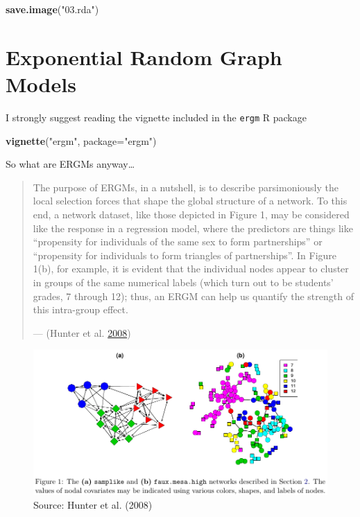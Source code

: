 \documentclass[]{book}
\newenvironment{Shaded}{\begin{snugshade}}{\end{snugshade}}
\newcommand{\KeywordTok}[1]{\textcolor[rgb]{0.13,0.29,0.53}{\textbf{#1}}}
\newcommand{\DataTypeTok}[1]{\textcolor[rgb]{0.13,0.29,0.53}{#1}}
\newcommand{\StringTok}[1]{\textcolor[rgb]{0.31,0.60,0.02}{#1}}
\newcommand{\NormalTok}[1]{#1}
\theoremstyle{definition}
\theoremstyle{definition}
\theoremstyle{definition}
\theoremstyle{remark}
\begin{document}
\begin{Shaded}
\begin{Highlighting}[]
\KeywordTok{save.image}\NormalTok{(}\StringTok{"03.rda"}\NormalTok{)}
\end{Highlighting}
\end{Shaded}

\chapter{Exponential Random Graph
Models}\label{exponential-random-graph-models}

I strongly suggest reading the vignette included in the \texttt{ergm} R
package

\begin{Shaded}
\begin{Highlighting}[]
\KeywordTok{vignette}\NormalTok{(}\StringTok{"ergm"}\NormalTok{, }\DataTypeTok{package=}\StringTok{"ergm"}\NormalTok{)}
\end{Highlighting}
\end{Shaded}

So what are ERGMs anyway\ldots{}

\begin{quote}
The purpose of ERGMs, in a nutshell, is to describe parsimoniously the
local selection forces that shape the global structure of a network. To
this end, a network dataset, like those depicted in Figure 1, may be
considered like the response in a regression model, where the predictors
are things like ``propensity for individuals of the same sex to form
partnerships'' or ``propensity for individuals to form triangles of
partnerships''. In Figure 1(b), for example, it is evident that the
individual nodes appear to cluster in groups of the same numerical
labels (which turn out to be students' grades, 7 through 12); thus, an
ERGM can help us quantify the strength of this intra-group effect.

--- (Hunter et al. \protect\hyperlink{ref-Hunter2008}{2008})
\end{quote}

\begin{figure}
\centering
\includegraphics{hunter2008.png}
\caption{Source: Hunter et al. (2008)}
\end{figure}
\end{document}

